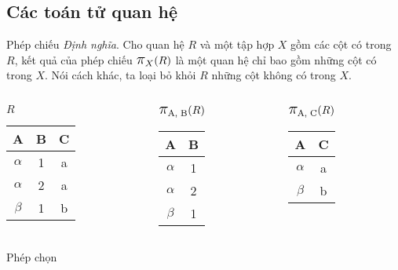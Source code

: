 \documentclass[11pt]{beamer}
\newcommand{\mmm}[1]{\mathlarger{\mathlarger{\mathlarger#1}}}%
\newcommand{\ppi}[2]{\mmm{\pi}_{#1}(#2)}%
\begin{document}
  \subsection{Các toán tử quan hệ}
  \begin{frame}{Phép chiếu}
    \textit{Định nghĩa}. Cho quan hệ $R$ và một tập hợp $X$ gồm các cột có trong $R$, 
    kết quả của phép chiếu $\ppi{X}{R}$ là một quan hệ chỉ bao gồm những cột có trong $X$.
    Nói cách khác, ta loại bỏ khỏi $R$ những cột không có trong $X$. 
  \end{frame}
  \begin{frame}
    \begin{columns}[T]
      \begin{column}{0.4\textwidth}
        \centering $R$
        \bigskip \\
        \begin{tabular}{||c|c|c||}
          \hline
          \textbf{A} & \textbf{B} & \textbf{C}  \\[0.5ex] \hline\hline
          $\alpha$ & 1 & a\\ \hline
          $\alpha$ & 2 & a\\ \hline
          $\beta$ & 1 & b\\ \hline
        \end{tabular}
      \end{column}
      \begin{column}{0.25\textwidth}
        \centering $\ppi{\text{A, B}}{R}$
        \medskip \\
        \begin{tabular}{||c|c||}
          \hline
          \textbf{A} & \textbf{B} \\[0.5ex] \hline\hline
          $\alpha$ & 1\\ \hline
          $\alpha$ & 2\\ \hline
          $\beta$ & 1\\ \hline
        \end{tabular}
      \end{column}
      \begin{column}{0.25\textwidth}
        \centering $\ppi{\text{A, C}}{R}$
        \medskip \\
        \begin{tabular}{||c|c||}
          \hline
          \textbf{A} & \textbf{C} \\[0.5ex] \hline\hline
          $\alpha$ & a\\ \hline
          $\beta$ & b\\ \hline
        \end{tabular}
      \end{column}
    \end{columns}
  \end{frame}
  \begin{frame}{Phép chọn}
  
  \end{frame}
\end{document}
